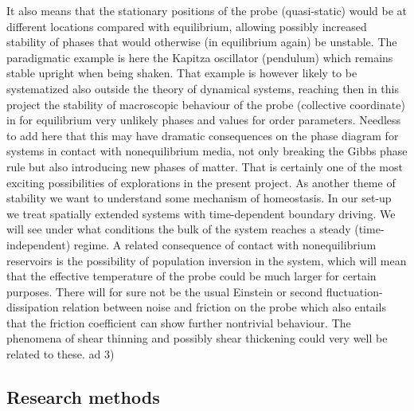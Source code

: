 It also means that the stationary positions of the probe (quasi-static) would be at different locations compared with equilibrium, allowing possibly increased stability of phases that would otherwise (in equilibrium again) be unstable.  The paradigmatic example is here the Kapitza oscillator (pendulum) which remains stable upright when being shaken.  That example is however likely to be systematized also outside the theory of dynamical systems, reaching then in this project the stability of macroscopic behaviour of the probe (collective coordinate) in for equilibrium very unlikely phases and values for order parameters.  Needless to  add here that this may have dramatic consequences on the phase diagram for systems in contact with nonequilibrium media, not only breaking the Gibbs phase rule but also introducing new phases of matter.  That is certainly one of the most exciting possibilities of explorations in the present project. As another theme of stability we want to understand some mechanism of homeostasis. In our set-up we treat spatially extended systems with time-dependent boundary driving. We will see under what conditions the bulk of the system reaches a steady (time-independent) regime. A related consequence of contact with nonequilibrium reservoirs is the possibility of population inversion in the system, which will mean that the effective temperature of the probe could be much larger for certain purposes.  There will for sure not be the usual Einstein or second fluctuation-dissipation relation between noise and friction on the probe which also entails that the friction coefficient can show further nontrivial behaviour.  The phenomena of shear thinning and possibly shear thickening could very well be related to these.
ad 3) 










\subsection{Research methods}\label{sec:methods}

